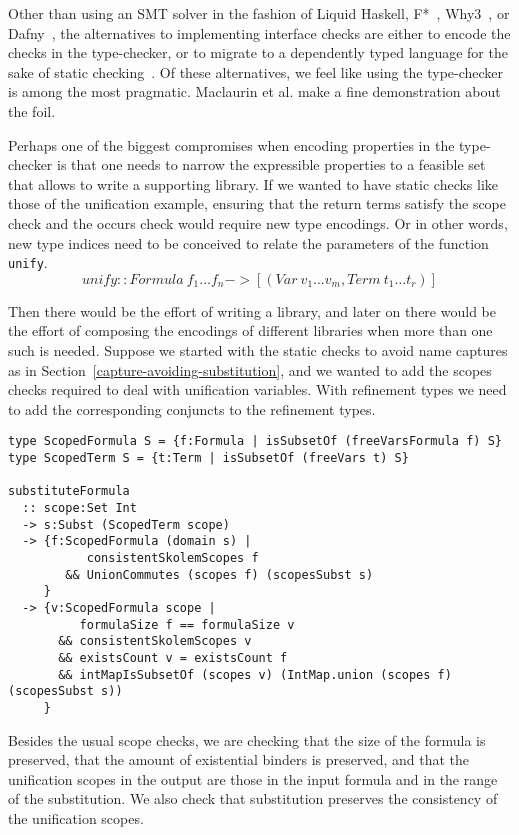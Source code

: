 \documentclass[sigconf, anonymous, review]{acmart}
\newcommand{\tc}[1]{{\small\texttt{#1}}}
\begin{document}
Other than using an SMT solver in the fashion of Liquid Haskell, F*~\cite{swamy16},
Why3~\cite{filli13}, or Dafny~\cite{leino17},
the alternatives to implementing interface checks are either to encode the checks in
the type-checker, or to migrate to a dependently typed language for the sake of
static checking~\cite{haftmann10, breitner18, carr22}. Of these alternatives,
we feel like using the type-checker is among the most pragmatic. Maclaurin et al. make
a fine demonstration about the foil.

Perhaps one of the biggest compromises when encoding properties in the type-checker
is that one needs to narrow the expressible properties to a feasible set that allows
to write a supporting library. If we wanted to have static checks like those of the
unification example, ensuring that the return terms satisfy the scope check and the
occurs check would require new type encodings. Or in other words, new type indices
need to be conceived to relate the parameters of the function \tc{unify}.
$$\mathit{unify} :: \mathit{Formula}\ f_1 \ldots f_n -> [(\mathit{Var}\ v_1 \ldots v_m, \mathit{Term}\ t_1 \ldots t_r)]$$

Then there would be the effort of writing a library, and later on there would be the
effort of composing the encodings of different libraries when more than one such
is needed. Suppose we started with the static checks to avoid name captures as in
Section~\ref{capture-avoiding-substitution}, and we wanted to add the scopes checks
required to deal with unification variables. With refinement types we need to add
the corresponding conjuncts to the refinement types.

\begin{verbatim}
type ScopedFormula S = {f:Formula | isSubsetOf (freeVarsFormula f) S}
type ScopedTerm S = {t:Term | isSubsetOf (freeVars t) S}

substituteFormula
  :: scope:Set Int
  -> s:Subst (ScopedTerm scope)
  -> {f:ScopedFormula (domain s) |
           consistentSkolemScopes f
        && UnionCommutes (scopes f) (scopesSubst s)
     }
  -> {v:ScopedFormula scope |
          formulaSize f == formulaSize v
       && consistentSkolemScopes v
       && existsCount v = existsCount f
       && intMapIsSubsetOf (scopes v) (IntMap.union (scopes f) (scopesSubst s))
     }
\end{verbatim}
Besides the usual scope checks, we are checking that the size of the formula
is preserved, that the amount of existential binders is preserved, and that
the unification scopes in the output are those in the input formula and in
the range of the substitution. We also check that substitution preserves
the consistency of the unification scopes.
\end{document}
